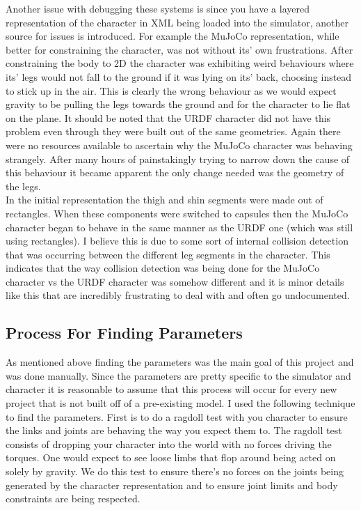 \documentclass[12pt, a4paper]{article}
\begin{document}
Another issue with debugging these systems is since you have a layered representation of the character in XML being loaded into the simulator, another source for issues is introduced. For example the MuJoCo representation, while better for constraining the character, was not without its' own frustrations. After constraining the body to 2D the character was exhibiting weird behaviours where its' legs would not fall to the ground if it was lying on its' back, choosing instead to stick up in the air.  This is clearly the wrong behaviour as we would expect gravity to be pulling the legs towards the ground and for the character to lie flat on the plane. It should be noted that the URDF character did not have this problem even through they were built out of the same geometries. Again there were no resources available to ascertain why the MuJoCo character was behaving strangely. After many hours of painstakingly trying to narrow down the cause of this behaviour it became apparent the only change needed was the geometry of the legs.\\
 
In the initial representation the thigh and shin segments were made out of rectangles. When these components were switched to capsules then the MuJoCo character began to behave in the same manner as the URDF one (which was still using rectangles). I believe this is due to some sort of internal collision detection that was occurring between the different leg segments in the character. This indicates that the way collision detection was being done for the MuJoCo character vs the URDF character was somehow different and it is minor details like this that are incredibly frustrating to deal with and often go undocumented.  

\subsection{Process For Finding Parameters}
As mentioned above finding the parameters was the main goal of this project and was done manually. Since the parameters are pretty specific to the simulator and character it is reasonable to assume that this process will occur for every new project that is not built off of a pre-existing model. I used the following technique to find the parameters. First is to do a ragdoll test with you character to ensure the links and joints are behaving the way you expect them to. The ragdoll test consists of dropping your character into the world with no forces driving the torques. One would expect to see loose limbs that flop around being acted on solely by gravity. We do this test to ensure there's no forces on the joints being generated by the character representation and to ensure joint limits and body constraints are being respected.\\
\end{document}
